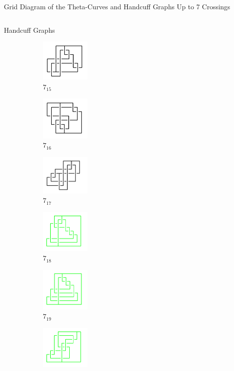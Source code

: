 \documentclass[final]{beamer}
\begin{document}
\begin{frame}[t]
\begin{alertblock}{Grid Diagram of the Theta-Curves and Handcuff Graphs Up to 7 Crossings}
\begin{columns}[t]
\begin{column}{0.3\textwidth}
\begin{alertblock}{Handcuff Graphs}
\begin{figure}
\begin{subfigure}{0.15\textwidth}
    \includegraphics[width=2.4cm]{../Midterm_Poster/grid_diagram/handcuff_7_15.png}
    \caption{$7_{15}$} 
    \end{subfigure}
    \begin{subfigure}{0.15\textwidth}
    \includegraphics[width=2.4cm]{../Midterm_Poster/grid_diagram/handcuff_7_16.png}
    \caption{$7_{16}$} 
    \end{subfigure}
    \begin{subfigure}{0.15\textwidth}
    \includegraphics[width=2.4cm]{../Midterm_Poster/grid_diagram/handcuff_7_17.png}
    \caption{$7_{17}$} 
    \end{subfigure}
    \begin{subfigure}{0.15\textwidth}
    \includegraphics[width=2.4cm]{../Midterm_Poster/grid_diagram/handcuff_7_18.png}
    \caption{$7_{18}$} 
    \end{subfigure}
    \begin{subfigure}{0.15\textwidth}
    \includegraphics[width=2.4cm]{../Midterm_Poster/grid_diagram/handcuff_7_19.png}
    \caption{$7_{19}$} 
    \end{subfigure}
    \begin{subfigure}{0.15\textwidth}
    \includegraphics[width=2.4cm]{../Midterm_Poster/grid_diagram/handcuff_7_20.png}

\end{subfigure}
\end{figure}
\end{alertblock}
\end{column}
\end{columns}
\end{alertblock}
\end{frame}
\end{document}
